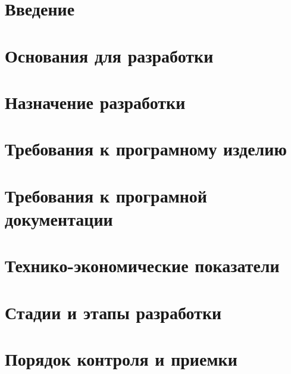 \documentclass[
encoding=utf8
]{eskd}
\begin{document}






\newpage
\tableofcontents
{}

\newpage
\section{Введение}


\newpage
\section{Основания для разработки}


\newpage
\section{Назначение разработки}


\newpage
\section{Требования к програмному изделию}


\newpage
\section{Требования к програмной документации}


\newpage
\section{Технико-экономические показатели}


\newpage
\section{Стадии и этапы разработки}


\newpage
\section{Порядок контроля и приемки}

\end{document}
